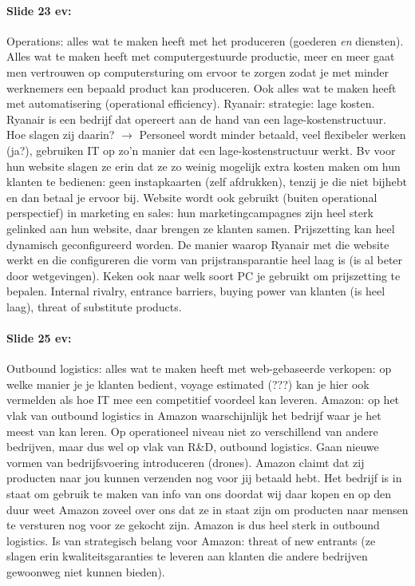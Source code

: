 \documentclass[10pt,a4paper]{report}
\begin{document}
\paragraph{Slide 23 ev:}Operations: alles wat te maken heeft met het produceren (goederen \emph{en} diensten). 
Alles wat te maken heeft met computergestuurde productie, meer en meer gaat men vertrouwen op computersturing om ervoor te zorgen zodat je met minder werknemers een bepaald product kan produceren.
Ook alles wat te maken heeft met automatisering (operational efficiency). Ryanair: strategie: lage kosten. Ryanair is een bedrijf dat opereert aan de hand van een lage-kostenstructuur. 
Hoe slagen zij daarin? $\rightarrow$ Personeel wordt minder betaald, veel flexibeler werken (ja?), gebruiken IT op zo'n manier dat een lage-kostenstructuur werkt. 
Bv voor hun website slagen ze erin dat ze zo weinig mogelijk extra kosten maken om hun klanten te bedienen: geen instapkaarten (zelf afdrukken), tenzij je die niet bijhebt en dan betaal je ervoor bij. 
Website wordt ook gebruikt (buiten operational perspectief) in marketing en sales: hun marketingcampagnes zijn heel sterk gelinked aan hun website, daar brengen ze klanten samen. 
Prijszetting kan heel dynamisch geconfigureerd worden. De manier waarop Ryanair met die website werkt en die configureren die vorm van prijstransparantie heel laag is (is al beter door wetgevingen). 
Keken ook naar welk soort PC je gebruikt om prijszetting te bepalen. 
Internal rivalry, entrance barriers, buying power van klanten (is heel laag), threat of substitute products.

\paragraph{Slide 25 ev:}Outbound logistics: alles wat te maken heeft met web-gebaseerde verkopen: op welke manier je je klanten bedient, voyage estimated (???) kan je hier ook vermelden als hoe IT mee een competitief voordeel kan leveren. 
Amazon:  op het vlak van outbound logistics in Amazon waarschijnlijk het bedrijf waar je het meest van kan leren. 
Op operationeel niveau niet zo verschillend van andere bedrijven, maar dus wel op vlak van R\&D, outbound logistics. 
Gaan nieuwe vormen van bedrijfsvoering introduceren (drones). 
Amazon claimt dat zij producten naar jou kunnen verzenden nog voor jij betaald hebt. 
Het bedrijf is in staat om gebruik te maken van info van ons doordat wij daar kopen en op den duur weet Amazon zoveel over ons dat ze in staat zijn om producten naar mensen te versturen nog voor ze gekocht zijn. 
Amazon is dus heel sterk in outbound logistics. 
Is van strategisch belang voor Amazon: threat of new entrants (ze slagen erin kwaliteitsgaranties te leveren aan klanten die andere bedrijven gewoonweg niet kunnen bieden).
\end{document}
